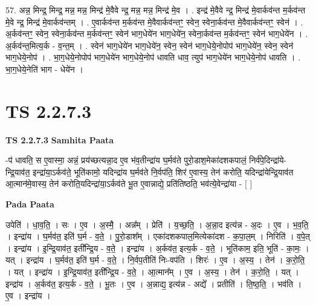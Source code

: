 \documentclass[17pt]{extarticle}
\begin{document}
57. अन्न॒ मिन्द्र॒ मिन्द्र॒ मन्न॒ मन्न॒ मिन्द्र॑ मे॒वैवे न्द्र॒ मन्न॒ मन्न॒ मिन्द्र॑ मे॒व । . इन्द्र॑ मे॒वैवे न्द्र॒ मिन्द्र॑ मे॒वार्कव॑न्त म॒र्कव॑न्त मे॒वे न्द्र॒ मिन्द्र॑ मे॒वार्कव॑न्तम् । . ए॒वार्कव॑न्त म॒र्कव॑न्त मे॒वैवार्कव॑न्तꣳ॒॒ स्वेन॒ स्वेना॒र्कव॑न्त मे॒वैवार्कव॑न्तꣳ॒॒ स्वेन॑ । . अ॒र्कव॑न्तꣳ॒॒ स्वेन॒ स्वेना॒र्कव॑न्त म॒र्कव॑न्तꣳ॒॒ स्वेन॑ भाग॒धेये॑न भाग॒धेये॑न॒ स्वेना॒र्कव॑न्त म॒र्कव॑न्तꣳ॒॒ स्वेन॑ भाग॒धेये॑न । . अ॒र्कव॑न्त॒मित्य॒र्क - व॒न्त॒म् । . स्वेन॑ भाग॒धेये॑न भाग॒धेये॑न॒ स्वेन॒ स्वेन॑ भाग॒धेये॒नोपोप॑ भाग॒धेये॑न॒ स्वेन॒ स्वेन॑ भाग॒धेये॒नोप॑ । . भा॒ग॒धेये॒नोपोप॑ भाग॒धेये॑न भाग॒धेये॒नोप॑ धावति धाव॒ त्युप॑ भाग॒धेये॑न भाग॒धेये॒नोप॑ धावति । . भा॒ग॒धेये॒नेति॑ भाग - धेये॑न । \newline
\pagebreak
{}
\section*{ TS 2.2.7.3 }

\textbf{TS 2.2.7.3 } \newline
\textbf{Samhita Paata} \newline

-प॑ धावति॒ स ए॒वास्मा॒ अन्नं॒ प्रय॑च्छत्यन्ना॒द ए॒व भ॑व॒तीन्द्रा॑य घ॒र्मव॑ते पुरो॒डाश॒मेका॑दशकपालं॒ निर्व॑पे॒दिन्द्रा॑ये-न्द्रि॒याव॑त॒ इन्द्रा॑या॒ऽर्कव॑ते॒ भूति॑कामो॒ यदिन्द्रा॑य घ॒र्मव॑ते नि॒र्वप॑ति॒ शिर॑ ए॒वास्य॒ तेन॑ करोति॒ यदिन्द्रा॑येन्द्रि॒याव॑त आ॒त्मान॑मे॒वास्य॒ तेन॑ करोति॒यदिन्द्रा॑या॒ऽर्कव॑ते भू॒त ए॒वान्नाद्ये॒ प्रति॑तिष्ठति॒ भव॑त्ये॒वेन्द्रा॑या - [  ] \newline

\textbf{Pada Paata} \newline

उपेति॑ । धा॒व॒ति॒ । सः । ए॒व । अ॒स्मै॒ । अन्न᳚म् । प्रेति॑ । य॒च्छ॒ति॒ । अ॒न्ना॒द इत्य॑न्न - अ॒दः । ए॒व । भ॒व॒ति॒ । इन्द्रा॑य । घ॒र्मव॑त॒ इति॑ घ॒र्म - व॒ते॒ । पु॒रो॒डाश᳚म् । एका॑दशकपाल॒मित्येका॑दश - क॒पा॒ल॒म् । निरिति॑ । व॒पे॒त् । इन्द्रा॑य । इ॒न्द्रि॒याव॑त॒ इती᳚न्द्रि॒य - व॒ते॒ । इन्द्रा॑य । अ॒र्कव॑त॒ इत्य॒र्क - व॒ते॒ । भूति॑काम॒ इति॒ भूति॑ - का॒मः॒ । यत् । इन्द्रा॑य । घ॒र्मव॑त॒ इति॑ घ॒र्म - व॒ते॒ । नि॒र्वप॒तीति॑ निः-वप॑ति । शिरः॑ । ए॒व । अ॒स्य॒ । तेन॑ । क॒रो॒ति॒ । यत् । इन्द्रा॑य । इ॒न्द्रि॒याव॑त॒ इती᳚न्द्रि॒य - व॒ते॒ । आ॒त्मान᳚म् । ए॒व । अ॒स्य॒ । तेन॑ । क॒रो॒ति॒ । यत् । इन्द्रा॑य । अ॒र्कव॑त॒ इत्य॒र्क - व॒ते॒ । भू॒तः । ए॒व । अ॒न्नाद्य॒ इत्य॑न्न - अद्ये᳚ । प्रतीति॑ । ति॒ष्ठ॒ति॒ । भव॑ति । ए॒व । इन्द्रा॑य ।  \newline
\end{document}
